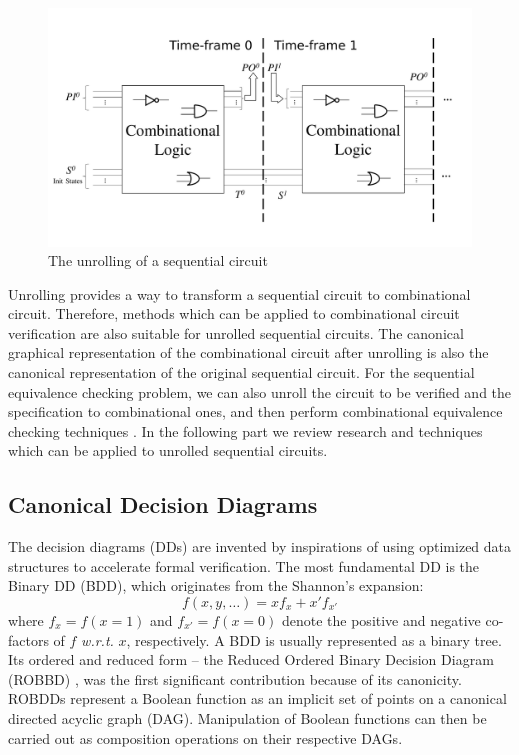 \begin{figure}[h]
\centerline{
\includegraphics[width=\textwidth]{newfig/unroll.pdf}
}
\caption{The unrolling of a sequential circuit}
\label{fig:unrolling}
\end{figure}

Unrolling provides a way to transform a sequential circuit to combinational 
circuit. Therefore,  methods which can be applied to combinational circuit 
verification are also suitable for unrolled sequential circuits. The canonical 
graphical representation of the combinational circuit after unrolling is also 
the canonical representation of the original sequential circuit. For the sequential 
equivalence checking problem, we can also unroll the circuit to be verified and the 
specification to combinational ones, and then perform combinational equivalence checking
techniques \cite{avoj2010combinational}. In the following part we review research and techniques which 
can be applied to unrolled sequential circuits.

\subsection{Canonical Decision Diagrams}
The decision diagrams (DDs) are invented by inspirations of 
using optimized data structures to accelerate formal verification.
The most fundamental DD is the Binary DD (BDD), which originates from the 
Shannon's expansion:
\begin{equation}
f(x, y, \dots) = x f_x + x' f_{x'}
\end{equation}
where $f_x = f(x = 1)$ and $f_{x'} = f(x = 0)$ denote the positive and
negative co-factors of $f$ {\it w.r.t.} $x$, respectively.
A BDD is usually represented as a binary tree.
Its ordered and reduced form -- the Reduced Ordered Binary Decision Diagram (ROBBD)
\cite{BRYA86}, was the first significant contribution because of its canonicity.  
 ROBDDs represent a Boolean function as an
implicit set of points on a canonical directed acyclic graph
(DAG). Manipulation of Boolean functions can then be carried out as
composition operations on their respective DAGs. 

